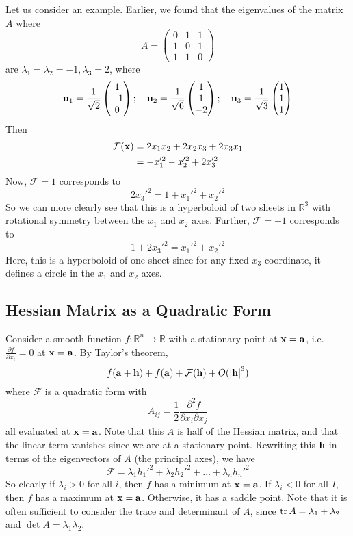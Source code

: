 Let us consider an example.
Earlier, we found that the eigenvalues of the matrix \(A\) where
\[
	A = \begin{pmatrix}
		0 & 1 & 1 \\ 1 & 0 & 1 \\ 1 & 1 & 0
	\end{pmatrix}
\]
are \(\lambda_1 = \lambda_2 = -1, \lambda_3 = 2\), where
\[
	\vb u_1 = \frac{1}{\sqrt 2} \begin{pmatrix}
		1 \\ -1 \\ 0
	\end{pmatrix};\quad \vb u_2 = \frac{1}{\sqrt 6}\begin{pmatrix}
		1 \\ 1 \\ -2
	\end{pmatrix};\quad \vb u_3 = \frac{1}{\sqrt 3}\begin{pmatrix}
		1 \\ 1 \\ 1
	\end{pmatrix}
\]
Then
\begin{align*}
	\mathcal F(\vb x) & = 2x_1x_2 + 2x_2x_3 + 2x_3x_1 \\
	                  & = -x_1'^2 -x_2'^2 + 2x_3'^2
\end{align*}
Now, \(\mathcal F = 1\) corresponds to
\[
	2x_3'^2 = 1 + x_1'^2 + x_2'^2
\]
So we can more clearly see that this is a hyperboloid of two sheets in \(\mathbb R^3\) with rotational symmetry between the \(x_1\) and \(x_2\) axes.
Further, \(\mathcal F = -1\) corresponds to
\[
	1 + 2x_3'^2 = x_1'^2 + x_2'^2
\]
Here, this is a hyperboloid of one sheet since for any fixed \(x_3\) coordinate, it defines a circle in the \(x_1\) and \(x_2\) axes.

\subsection{Hessian Matrix as a Quadratic Form}
Consider a smooth function \(f\colon \mathbb R^n \to \mathbb R\) with a stationary point at \(\vb x = \vb a\), i.e.\ \(\frac{\partial f}{\partial x_i} = 0\) at \(\vb x = \vb a\).
By Taylor's theorem,
\[
	f(\vb a + \vb h) + f(\vb a) + \mathcal F(\vb h) + O(\abs{\vb h}^3)
\]
where \(\mathcal F\) is a quadratic form with
\[
	A_{ij} = \frac{1}{2}\frac{\partial^2 f}{\partial x_i\partial x_j}
\]
all evaluated at \(\vb x = \vb a\).
Note that this \(A\) is half of the Hessian matrix, and that the linear term vanishes since we are at a stationary point.
Rewriting this \(\vb h\) in terms of the eigenvectors of \(A\) (the principal axes), we have
\[
	\mathcal F = \lambda_1 h_1'^2 + \lambda_2 h_2'^2 + \dots + \lambda_n h_n'^2
\]
So clearly if \(\lambda_i > 0\) for all \(i\), then \(f\) has a minimum at \(\vb x = \vb a\).
If \(\lambda_i < 0\) for all \(I\), then \(f\) has a maximum at \(\vb x = \vb a\).
Otherwise, it has a saddle point.
Note that it is often sufficient to consider the trace and determinant of \(A\), since \(\trace A = \lambda_1 + \lambda_2\) and \(\det A = \lambda_1\lambda_2\).
